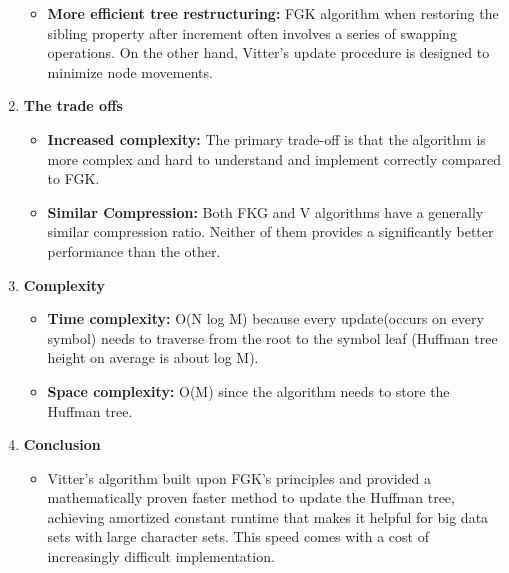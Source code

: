 \begin{enumerate}[label=\textbf{\Alph*.}]
\begin{itemize}
        \item \textbf{More efficient tree restructuring:} FGK algorithm when restoring the sibling property after increment often involves a series of swapping operations. On the other hand, Vitter's update procedure is designed to minimize node movements.
    \end{itemize}
    \item \textbf{The trade offs}
    \begin{itemize}
        \item \textbf{Increased complexity:} The primary trade-off is that the algorithm is more complex and hard to understand and implement correctly compared to FGK.
        \item \textbf{Similar Compression:} Both FKG and V algorithms have a generally similar compression ratio. Neither of them provides a significantly better performance than the other.
    \end{itemize}
    \item \textbf{Complexity}
    \begin{itemize}
        \item \textbf{Time complexity:} O(N log M) because every update(occurs on every symbol) needs to traverse from the root to the symbol leaf (Huffman tree height on average is about log M).
        \item \textbf{Space complexity:} O(M) since the algorithm needs to store the Huffman tree.
    \end{itemize}
    \item \textbf{Conclusion}
    \begin{itemize}
        \item Vitter’s algorithm built upon FGK’s principles and provided a mathematically proven faster method to update the Huffman tree, achieving amortized constant runtime that makes it helpful for big data sets with large character sets. This speed comes with a cost of increasingly difficult implementation.
    \end{itemize}
\end{enumerate}

